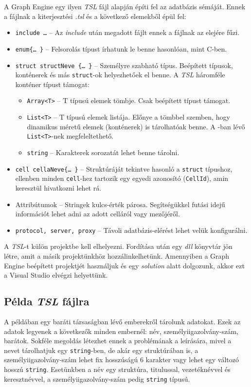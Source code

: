 A Graph Engine egy ilyen \emph{TSL} fájl alapján építi fel az adatbázis sémáját. Ennek a fájlnak a kiterjesztési \emph{.tsl} és a következő elemekből épül fel:
\begin{itemize}
	\item \texttt{include \ldots{}} \--- Az \emph{include} után megadott fájlt ennek a fájlnak az elejére fűzi.
	\item \texttt{enum\{\ldots{} \}} \--- Felsorolás típust írhatunk le benne hasonlóan, mint C-ben.
	\item \texttt{struct structNeve \{\ldots{} \}} \--- Személyre szabható típus. Beépített típusok, konténerek és más \texttt{struct}-ok helyezhetőek el benne. A \emph{TSL} háromféle konténer típust támogat:
	\begin{itemize}
		\item \texttt{Array<T>} \--- T típusú elemek tömbje. Csak beépített típust támogat.
		\item \texttt{List<T>} \--- T típusú elemek listája. Előnye a tömbbel szemben, hogy dinamikus méretű elemek (konténerek) is tárolhatóak benne. A \Csh{}-ban lévő \texttt{List<T>}-nek megfeleltethető.
		 \item \texttt{string} \--- Karakterek sorozatát lehet benne tárolni.
	\end{itemize}
	\item \texttt{cell cellaNeve\{\ldots{} \}} \--- Struktúráját tekintve hasonló a \texttt{struct} típushoz, ellenben minden \texttt{cell}-hez tartozik egy egyedi azonosító (\texttt{CellId}), amin keresztül hivatkozni lehet rá. 
	\item Attribútumok \--- Stringek kulcs-érték párosa. Segítségükkel futási idejű információt lehet adni az adott celláról vagy mezőjéről.
	\item \texttt{protocol, server, proxy} \--- Távoli adatbázis-elérést lehet velük konfigurálni.
\end{itemize}

A \emph{TSL}-t külön projektbe kell elhelyezni. Fordítása után egy \emph{dll} könyvtár jön létre, amit a másik \Csh{} projektünkhöz hozzálinkelhetünk. Amennyiben a Graph Engine beépített projektjét használjuk és egy \emph{solution} alatt dolgozunk, akkor ezt a Visual Studio elvégzi helyettünk. 

\subsection{Példa \emph{TSL} fájlra}

A példában egy baráti társaságban lévő emberekről tárolunk adatokat. Ezek az adatok legyenek a következők minden embernél: név, személyiigazolvány-szám, barátok. Sokféle megoldás létezhet ennek a problémának a leírására, mivel a nevet tárolhatjuk egy \texttt{string}-ben, de akár egy struktúrában is, a személyiigazolvány-szám lehet fix hosszúságú 6 karakter vagy lehet egy változó hosszú \texttt{string}. Esetünkben a név egy struktúra, titulussal, vezetéknévvel és keresztnévvel, a  személyiigazolvány-szám pedig \texttt{string} típusú.

